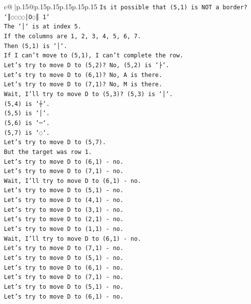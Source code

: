 \documentclass{article}
\begin{document}
{\begin{supertabular}{c@{$\;$}|p{.15\linewidth}@{}p{.15\linewidth}p{.15\linewidth}p{.15\linewidth}p{.15\linewidth}p{.15\linewidth}}
{{{\texttt{Is it possible that (5,1) is NOT a border?} \\
\texttt{`║◌◌◌◌│O◌║ 1`} \\
\texttt{The `│` is at index 5.} \\
\texttt{If the columns are 1, 2, 3, 4, 5, 6, 7.} \\
\texttt{Then (5,1) is `│`.} \\
\texttt{If I can't move to (5,1), I can't complete the row.} \\
\texttt{Let's try to move D to (5,2)? No, (5,2) is `├`.} \\
\texttt{Let's try to move D to (6,1)? No, A is there.} \\
\texttt{Let's try to move D to (7,1)? No, M is there.} \\
\texttt{Wait, I'll try to move D to (5,3)? (5,3) is `│`.} \\
\texttt{(5,4) is `┼`.} \\
\texttt{(5,5) is `│`.} \\
\texttt{(5,6) is `─`.} \\
\texttt{(5,7) is `◌`.} \\
\texttt{Let's try to move D to (5,7).} \\
\texttt{But the target was row 1.} \\
\texttt{Let's try to move D to (6,1) {-} no.} \\
\texttt{Let's try to move D to (7,1) {-} no.} \\
\texttt{Wait, I'll try to move D to (6,1) {-} no.} \\
\texttt{Let's try to move D to (5,1) {-} no.} \\
\texttt{Let's try to move D to (4,1) {-} no.} \\
\texttt{Let's try to move D to (3,1) {-} no.} \\
\texttt{Let's try to move D to (2,1) {-} no.} \\
\texttt{Let's try to move D to (1,1) {-} no.} \\
\texttt{Wait, I'll try to move D to (6,1) {-} no.} \\
\texttt{Let's try to move D to (7,1) {-} no.} \\
\texttt{Let's try to move D to (5,1) {-} no.} \\
\texttt{Let's try to move D to (6,1) {-} no.} \\
\texttt{Let's try to move D to (7,1) {-} no.} \\
\texttt{Let's try to move D to (5,1) {-} no.} \\
\texttt{Let's try to move D to (6,1) {-} no.} \\
}}}
\end{supertabular}}
\end{document}

